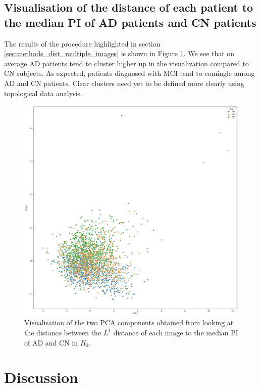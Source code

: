 \documentclass{article}
\begin{document}
\subsection{Visualisation of the distance of each patient to the median PI of AD patients and CN patients}

The results of the procedure highlighted in section \ref{sec:methods_dist_multiple_images} is shown
in Figure \ref{fig:vis_pca_ad_cn}. We see that on average AD patients tend to cluster higher up in
the visualization compared to CN subjects. As expected, patients diagnosed with MCI tend to
comingle among AD and CN patients. Clear clusters need yet to be defined more clearly using topological
data analysis.

\begin{figure}
  \centering \includegraphics[width=\textwidth]{figures/cluster_CN_H_2_AD_H_2_PCA.png}
  \caption{Visualisation of the two PCA components obtained from looking at the distance between the
    $L^1$ distance of each image to the median PI of AD and CN in $H_2$.}
  \label{fig:vis_pca_ad_cn}
\end{figure}

\section{Discussion}\label{sec:discussion}
\end{document}
